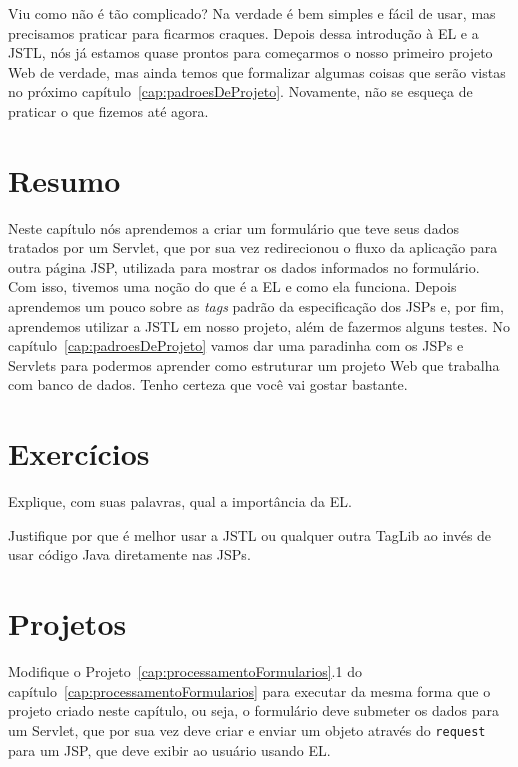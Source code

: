 Viu como não é tão complicado? Na verdade é bem simples e fácil de usar, mas precisamos praticar para ficarmos craques. Depois dessa introdução à EL e a JSTL, nós já estamos quase prontos para começarmos o nosso primeiro projeto Web de verdade, mas ainda temos que formalizar algumas coisas que serão vistas no próximo capítulo~\ref{cap:padroesDeProjeto}. Novamente, não se esqueça de praticar o que fizemos até agora.  


\section{Resumo}

Neste capítulo nós aprendemos a criar um formulário que teve seus dados tratados por um Servlet, que por sua vez redirecionou o fluxo da aplicação para outra página JSP, utilizada para mostrar os dados informados no formulário. Com isso, tivemos uma noção do que é a EL e como ela funciona. Depois aprendemos um pouco sobre as \textit{tags} padrão da especificação dos JSPs e, por fim, aprendemos utilizar a JSTL em nosso projeto, além de fazermos alguns testes. No capítulo~\ref{cap:padroesDeProjeto} vamos dar uma paradinha com os JSPs e Servlets para podermos aprender como estruturar um projeto Web que trabalha com banco de dados. Tenho certeza que você vai gostar bastante.


\section{Exercícios}

\begin{exercicioSemArquivo}{}{}{}
    Explique, com suas palavras, qual a importância da EL.
\end{exercicioSemArquivo}

\begin{exercicioSemArquivo}{}{}{}
    Justifique por que é melhor usar a JSTL ou qualquer outra TagLib ao invés de usar código Java diretamente nas JSPs.
\end{exercicioSemArquivo}

\section{Projetos}

\begin{projetoSemArquivo}{}{}{}
    Modifique o Projeto~\ref{cap:processamentoFormularios}.1 do capítulo~\ref{cap:processamentoFormularios} para executar da mesma forma que o projeto criado neste capítulo, ou seja, o formulário deve submeter os dados para um Servlet, que por sua vez deve criar e enviar um objeto através do \texttt{request} para um JSP, que deve exibir ao usuário usando EL.
\end{projetoSemArquivo}

